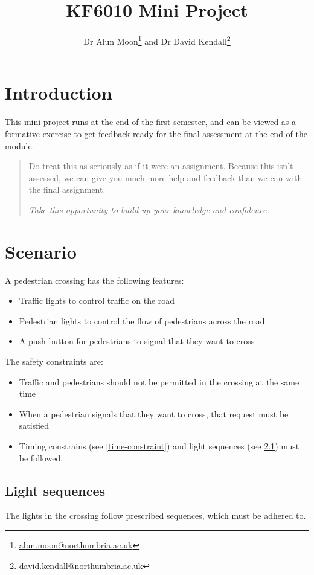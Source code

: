 \documentclass{article}
\title{KF6010 Mini Project}
\author{Dr Alun Moon\thanks{\url{alun.moon@northumbria.ac.uk}} and
Dr David Kendall\thanks{\url{david.kendall@northumbria.ac.uk}}}
\begin{document}
\maketitle

\begin{abstract}
\end{abstract}

\section{Introduction}
	This mini project runs at the end of the first semester, and can be viewed
	as a formative exercise to get feedback ready for the final assessment at
	the end of the module.
	\begin{quote}
		Do treat this as seriously as if it were an assignment.
		Because this isn't assessed, we can give you much more help and
		feedback than we can with the final assignment.  

		\emph{Take this opportunity to build up your knowledge and confidence.}
	\end{quote}

\section{Scenario}
A pedestrian crossing has the following features:
\begin{itemize}
	\item Traffic lights to control traffic on the road
	\item Pedestrian lights to control the flow of pedestrians across the road
	\item A push button for pedestrians to signal that they want to cross
\end{itemize}
The safety constraints are:
\begin{itemize}
	\item Traffic and pedestrians should not be permitted in the crossing at
		the same time
	\item When a pedestrian signals that they want to cross, that request must
		be satisfied
	\item Timing constrains (see \ref{time-constraint}) and light
		sequences (see \ref{light-sequence}) must be followed.
\end{itemize}

\subsection{Light sequences}\label{light-sequence}
The lights in the crossing follow prescribed sequences, which must be adhered
to.
\end{document}
